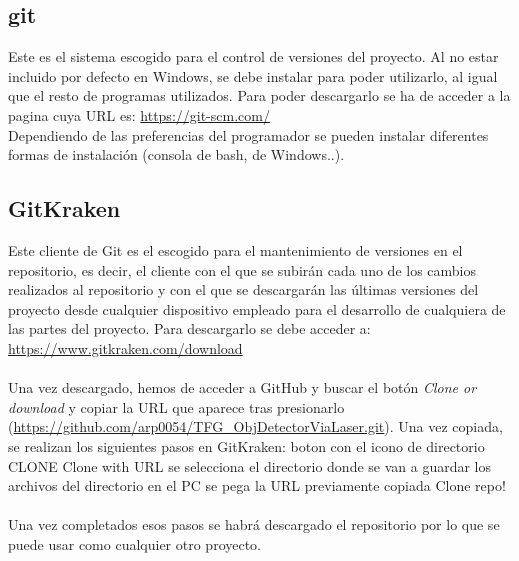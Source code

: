 \subsection{git}
Este es el sistema escogido para el control de versiones del proyecto. Al no estar incluido por defecto en Windows, se debe instalar para poder utilizarlo, al igual que el resto de programas utilizados. Para poder descargarlo se ha de acceder a la pagina cuya URL es: \url{https://git-scm.com/}\\
Dependiendo de las preferencias del programador se pueden instalar diferentes formas de instalación (consola de bash, de Windows..).

\subsection{GitKraken}
Este cliente de Git es el escogido para el mantenimiento de versiones en el repositorio, es decir, el cliente con el que se subirán cada uno de los cambios realizados al repositorio y con el  que se descargarán las últimas versiones del proyecto desde cualquier dispositivo empleado para el desarrollo de cualquiera de las partes del proyecto. Para descargarlo se debe acceder a: \url{https://www.gitkraken.com/download}\\
\\
Una vez descargado, hemos de acceder a GitHub y buscar el botón \textit{Clone or download} y copiar la URL que aparece tras presionarlo (\url{https://github.com/arp0054/TFG_ObjDetectorViaLaser.git}). Una vez copiada, se realizan los siguientes pasos en GitKraken: boton con el icono de directorio \rightarrow CLONE \rightarrow Clone with URL \rightarrow se selecciona el directorio donde se van a guardar los archivos del directorio en el PC \rightarrow se pega la URL previamente copiada \rightarrow Clone repo! \\
\\
Una vez completados esos pasos se habrá descargado el repositorio por lo que se puede usar como cualquier otro proyecto.\\

